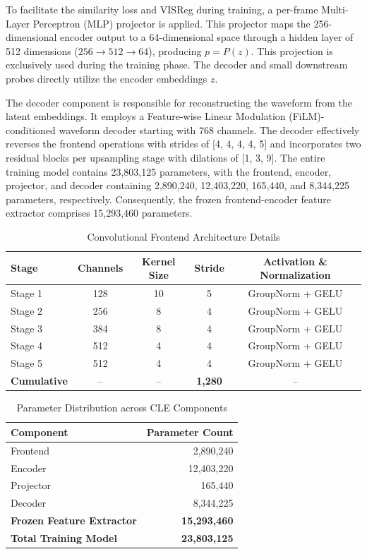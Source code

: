 To facilitate the similarity loss and VISReg during training, a per-frame Multi-Layer Perceptron (MLP) projector is applied. This projector maps the 256-dimensional encoder output to a 64-dimensional space through a hidden layer of 512 dimensions ($256 \rightarrow 512 \rightarrow 64$), producing $p = P(z)$. This projection is exclusively used during the training phase. The decoder and small downstream probes directly utilize the encoder embeddings $z$.

The decoder component is responsible for reconstructing the waveform from the latent embeddings. It employs a Feature-wise Linear Modulation (FiLM)-conditioned waveform decoder starting with 768 channels. The decoder effectively reverses the frontend operations with strides of [4, 4, 4, 4, 5] and incorporates two residual blocks per upsampling stage with dilations of [1, 3, 9]. The entire training model contains 23,803,125 parameters, with the frontend, encoder, projector, and decoder containing 2,890,240, 12,403,220, 165,440, and 8,344,225 parameters, respectively. Consequently, the frozen frontend-encoder feature extractor comprises 15,293,460 parameters.

\begin{table}[htbp]
  \centering
  \caption{Convolutional Frontend Architecture Details}
  \label{tab:frontend_arch}
  \renewcommand{\arraystretch}{1.3}
  \begin{tabular}{l c c c c}
    \toprule
    \textbf{Stage} & \textbf{Channels} & \textbf{Kernel Size} & \textbf{Stride} & \textbf{Activation \& Normalization} \\
    \midrule
    Stage 1 & 128 & 10 & 5 & GroupNorm + GELU \\
    Stage 2 & 256 & 8 & 4 & GroupNorm + GELU \\
    Stage 3 & 384 & 8 & 4 & GroupNorm + GELU \\
    Stage 4 & 512 & 4 & 4 & GroupNorm + GELU \\
    Stage 5 & 512 & 4 & 4 & GroupNorm + GELU \\
    \midrule
    \textbf{Cumulative} & -- & -- & \textbf{1,280} & -- \\
    \bottomrule
  \end{tabular}
\end{table}

\begin{table}[htbp]
  \centering
  \caption{Parameter Distribution across CLE Components}
  \label{tab:parameter_dist}
  \renewcommand{\arraystretch}{1.3}
  \begin{tabular}{l r}
    \toprule
    \textbf{Component} & \textbf{Parameter Count} \\
    \midrule
    Frontend & 2,890,240 \\
    Encoder & 12,403,220 \\
    Projector & 165,440 \\
    Decoder & 8,344,225 \\
    \midrule
    \textbf{Frozen Feature Extractor} & \textbf{15,293,460} \\
    \textbf{Total Training Model} & \textbf{23,803,125} \\
    \bottomrule
  \end{tabular}
\end{table}

